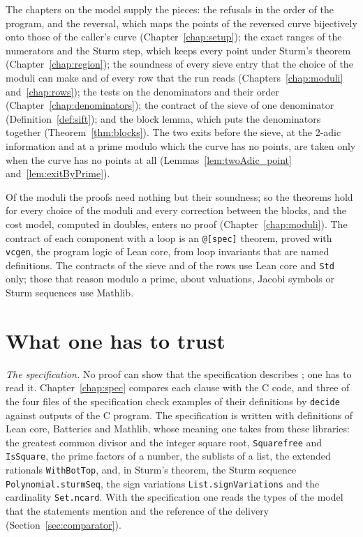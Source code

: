 The chapters on the model supply the pieces: the refusals in the order of the program, and the
reversal, which maps the points of the reversed curve bijectively onto those of the caller's curve
(Chapter~\ref{chap:setup}); the exact ranges of the numerators and the Sturm step, which keeps every
point under Sturm's theorem (Chapter~\ref{chap:region}); the soundness of every sieve entry that the
choice of the moduli can make and of every row that the run reads (Chapters~\ref{chap:moduli}
and~\ref{chap:rows}); the tests on the denominators and their order
(Chapter~\ref{chap:denominators}); the contract of the sieve of one denominator
(Definition~\ref{def:sift}); and the block lemma, which puts the denominators together
(Theorem~\ref{thm:blocks}). The two exits before the sieve, at the 2-adic information and at a
prime modulo which the curve has no points, are taken only when the curve has no points at all
(Lemmas~\ref{lem:twoAdic_point} and~\ref{lem:exitByPrime}).

Of the moduli the proofs need nothing but their soundness; so the theorems hold for every choice of
the moduli and every correction between the blocks, and the cost model, computed in doubles, enters
no proof (Chapter~\ref{chap:moduli}). The contract of each component with a loop is an
\verb|@[spec]| theorem, proved with \verb|vcgen|, the program logic of Lean core, from loop
invariants that are named definitions. The contracts of the sieve and of the rows use Lean core and
\verb|Std| only; those that reason modulo a prime, about valuations, Jacobi symbols or Sturm
sequences use Mathlib.

\section{What one has to trust}\label{sec:overviewTrust}

\emph{The specification.} No proof can show that the specification describes \ratpoints{}; one has to
read it. Chapter~\ref{chap:spec} compares each clause with the C code, and three of the four files
of the specification check examples of their definitions by \verb|decide| against outputs of the C
program. The specification is written with definitions of Lean core, Batteries and Mathlib, whose
meaning one takes from these libraries: the greatest common divisor and the integer square root,
\verb|Squarefree| and \verb|IsSquare|, the prime factors of a number, the sublists of a list, the
extended rationals \verb|WithBotTop|, and, in Sturm's theorem, the Sturm sequence
\verb|Polynomial.sturmSeq|, the sign variations \verb|List.signVariations| and the cardinality
\verb|Set.ncard|. With the specification one reads the types of the model that the statements
mention and the reference of the delivery (Section~\ref{sec:comparator}).


